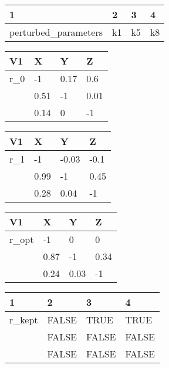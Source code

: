 \documentclass[10pt,a4paper]{article}
\begin{document}
\begin{table}[ht]
\centering
\begin{tabular}{llll}
  \hline
1 & 2 & 3 & 4 \\ 
  \hline
perturbed\_parameters & k1 & k5 & k8 \\ 
   \hline
\end{tabular}
\end{table}


\begin{table}[ht]
\centering
\begin{tabular}{llll}
  \hline
V1 & X & Y & Z \\ 
  \hline
r\_0 & -1 & 0.17 & 0.6 \\ 
   & 0.51 & -1 & 0.01 \\ 
   & 0.14 & 0 & -1 \\ 
   \hline
\end{tabular}
\end{table}


\begin{table}[ht]
\centering
\begin{tabular}{llll}
  \hline
V1 & X & Y & Z \\ 
  \hline
r\_1 & -1 & -0.03 & -0.1 \\ 
   & 0.99 & -1 & 0.45 \\ 
   & 0.28 & 0.04 & -1 \\ 
   \hline
\end{tabular}
\end{table}


\begin{table}[ht]
\centering
\begin{tabular}{llll}
  \hline
V1 & X & Y & Z \\ 
  \hline
r\_opt & -1 & 0 & 0 \\ 
   & 0.87 & -1 & 0.34 \\ 
   & 0.24 & 0.03 & -1 \\ 
   \hline
\end{tabular}
\end{table}


\begin{table}[ht]
\centering
\begin{tabular}{llll}
  \hline
1 & 2 & 3 & 4 \\ 
  \hline
r\_kept & FALSE & TRUE & TRUE \\ 
   & FALSE & FALSE & FALSE \\ 
   & FALSE & FALSE & FALSE \\ 
   \hline
\end{tabular}
\end{table}
 
\end{document}
